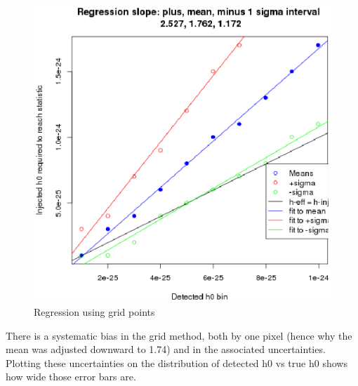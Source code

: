 \begin{figure}
\begin{center}
\includegraphics[width=0.3\paperwidth,height=0.2\paperheight]{PlotHeffVsH0TrueRegressions.eps}
\caption{Regression using grid points
}
\end{center}
\end{figure}


There is a systematic bias in the grid method, both by one pixel (hence why the mean was adjusted downward to 1.74) and in the associated uncertainties. Plotting these uncertainties on the distribution of {detected h0} vs {true h0} shows how wide those error bars are.

